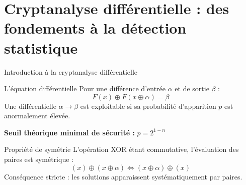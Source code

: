 \section{ Cryptanalyse différentielle : des fondements à la détection statistique}

\begin{frame}{Introduction à la cryptanalyse différentielle}

    \begin{block}{L'équation différentielle}
        Pour une différence d'entrée $\alpha$ et de sortie $\beta$ :
        \begin{equation*}
            F(x) \oplus F(x \oplus \alpha) = \beta
        \end{equation*}
        Une différentielle $\alpha \rightarrow \beta$ est exploitable si sa probabilité d'apparition $p$ est anormalement élevée.
    \end{block} 

    \vspace{0.2cm}
    \textbf{Seuil théorique minimal de sécurité :} $p = 2^{1-n}$
    
    \vspace{0.2cm}
    \begin{alertblock}{Propriété de symétrie}
        L'opération XOR étant commutative, l'évaluation des paires est symétrique :
        \begin{equation*}
            (x) \oplus (x \oplus \alpha) \iff (x \oplus \alpha) \oplus (x)
        \end{equation*} 
        Conséquence stricte : les solutions apparaissent systématiquement par paires.
    \end{alertblock}
    
\end{frame}

